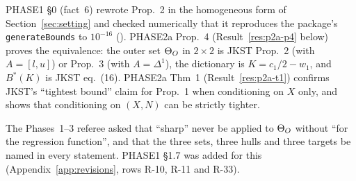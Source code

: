 PHASE1 \S0 (fact~6) rewrote Prop.~2 in the homogeneous form of
Section~\ref{sec:setting} and checked numerically that it reproduces the
package's \texttt{generateBounds} to $10^{-16}$
(). PHASE2a Prop.~4
(Result~\ref{res:p2a-p4} below) proves the equivalence: the outer set $\Theta_O$ in
$2\times2$ is JKST Prop.~2 (with $A=[l,u]$) or Prop.~3 (with $A=\Delta^1$), the
dictionary is $K=c_1/2-w_1$, and $B^*(K)$ is JKST eq.~(16). PHASE2a Thm~1
(Result~\ref{res:p2a-t1}) confirms JKST's ``tightest bound'' claim for Prop.~1
when conditioning on $X$ only, and shows that conditioning on $(X,N)$ can be
strictly tighter.

\begin{revnote}
The Phases~1--3 referee asked that ``sharp'' never be applied to $\Theta_O$ without
``for the regression function'', and that the three sets, three hulls and three
targets be named in every statement. PHASE1 \S1.7 was added for this
(Appendix~\ref{app:revisions}, rows R-10, R-11 and R-33).
\end{revnote}
